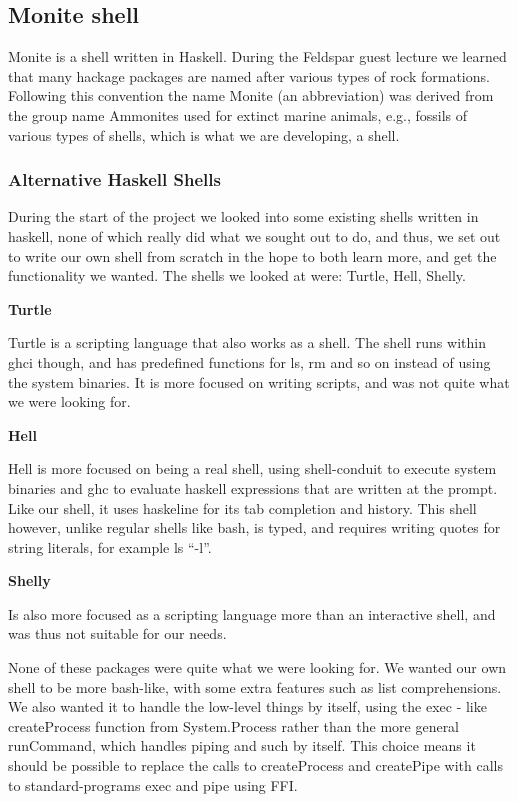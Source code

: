\documentclass[11pt,a4paper]{article}
\begin{document}
\subsection{Monite shell}
\label{monite}

Monite is a shell written in Haskell. During the Feldspar guest lecture we
learned that many hackage packages are named after various types of rock
formations. Following this convention the name Monite (an abbreviation) was
derived from the group name Ammonites used for extinct marine animals, e.g.,
fossils of various types of shells, which is what we are developing, a shell.

\subsubsection{Alternative Haskell Shells}

During the start of the project we looked into some existing shells written in
haskell, none of which really did what we sought out to do, and thus, we set out
to write our own shell from scratch in the hope to both learn more, and get the
functionality we wanted. The shells we looked at were: Turtle, Hell, Shelly.

\textbf{Turtle}

Turtle is a scripting language that also works as a shell. The shell runs
within ghci though, and has predefined functions for ls, rm and so on instead
of using the system binaries. It is more focused on writing scripts, and was
not quite what we were looking for.

\textbf{Hell}

Hell is more focused on being a real shell, using shell-conduit to execute
system binaries and ghc to evaluate haskell expressions that are written at the
prompt. Like our shell, it uses haskeline for its tab completion and history.
This shell however, unlike regular shells like bash, is typed, and requires
writing quotes for string literals, for example ls ``-l''.

\textbf{Shelly}

Is also more focused as a scripting language more than an interactive shell,
and was thus not suitable for our needs.

None of these packages were quite what we were looking for. We wanted
our own shell to be more bash-like, with some extra features such as list
comprehensions. We also wanted it to handle the low-level things by itself,
using the exec - like createProcess function from System.Process rather than
the more general runCommand, which handles piping and such by itself. This
choice means it should be possible to replace the calls to createProcess and
createPipe with calls to standard-programs exec and pipe using FFI.
\end{document}
